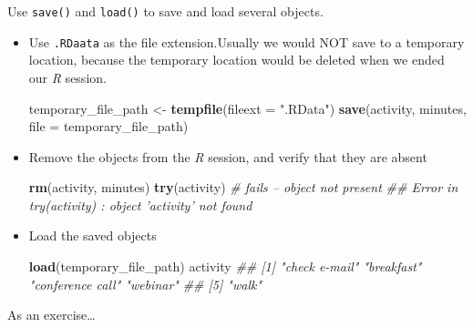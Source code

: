 \documentclass[
]{book}
\newenvironment{Shaded}{\begin{snugshade}}{\end{snugshade}}
\newcommand{\CommentTok}[1]{\textcolor[rgb]{0.56,0.35,0.01}{\textit{#1}}}
\newcommand{\DataTypeTok}[1]{\textcolor[rgb]{0.13,0.29,0.53}{#1}}
\newcommand{\KeywordTok}[1]{\textcolor[rgb]{0.13,0.29,0.53}{\textbf{#1}}}
\newcommand{\NormalTok}[1]{#1}
\newcommand{\StringTok}[1]{\textcolor[rgb]{0.31,0.60,0.02}{#1}}
\begin{document}
Use \texttt{save()} and \texttt{load()} to save and load several objects.

\begin{itemize}
\item
  Use \texttt{.RDaata} as the file extension.Usually we would NOT save to a temporary location, because the temporary location would be deleted when we ended our \emph{R} session.

\begin{Shaded}
\begin{Highlighting}[]
\NormalTok{temporary_file_path <-}\StringTok{ }\KeywordTok{tempfile}\NormalTok{(}\DataTypeTok{fileext =} \StringTok{".RData"}\NormalTok{)}
\KeywordTok{save}\NormalTok{(activity, minutes, }\DataTypeTok{file =}\NormalTok{ temporary_file_path)}
\end{Highlighting}
\end{Shaded}
\item
  Remove the objects from the \emph{R} session, and verify that they are absent

\begin{Shaded}
\begin{Highlighting}[]
\KeywordTok{rm}\NormalTok{(activity, minutes)}
\KeywordTok{try}\NormalTok{(activity) }\CommentTok{# fails -- object not present}
\CommentTok{## Error in try(activity) : object 'activity' not found}
\end{Highlighting}
\end{Shaded}
\item
  Load the saved objects

\begin{Shaded}
\begin{Highlighting}[]
\KeywordTok{load}\NormalTok{(temporary_file_path)}
\NormalTok{activity}
\CommentTok{## [1] "check e-mail"    "breakfast"       "conference call" "webinar"        }
\CommentTok{## [5] "walk"}
\end{Highlighting}
\end{Shaded}
\end{itemize}

As an exercise\ldots{}
\end{document}
